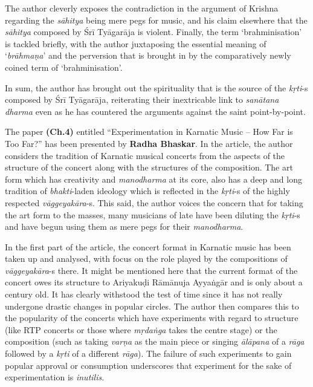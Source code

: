 The author cleverly exposes the contradiction in the argument of Krishna regarding the \textit{sāhitya} being mere pegs for music, and his claim elsewhere that the \textit{sāhitya} composed by Śrī Tyāgarāja is violent. Finally, the term ‘brahminisation’ is tackled briefly, with the author juxtaposing the essential meaning of ‘\textit{brāhmaṇa}’ and the perversion that is brought in by the comparatively newly coined term of ‘brahminisation’.

In sum, the author has brought out the spirituality that is the source of the \textit{kṛti}-s composed by Śrī Tyāgarāja, reiterating their inextricable link to \textit{sanātana dharma} even as he has countered the arguments against the saint point-by-point.

The paper \textbf{(Ch.4)} entitled “Experimentation in Karnatic Music – How Far is Too Far?” has been presented by \textbf{Radha Bhaskar}. In the article, the author considers the tradition of Karnatic musical concerts from the aspects of the structure of the concert along with the structures of the composition. The art form which has creativity and \textit{manodharma} at its core, also has a deep and long tradition of \textit{bhakti}-laden ideology which is reflected in the \textit{kṛti}-s of the highly respected \textit{vāggeyakāra}-s. This said, the author voices the concern that for taking the art form to the masses, many musicians of late have been diluting the \textit{kṛti}-s and have begun using them as mere pegs for their \textit{manodharma}.

In the first part of the article, the concert format in Karnatic music has been taken up and analysed, with focus on the role played by the compositions of \textit{vāggeyakāra}-s there. It might be mentioned here that the current format of the concert owes its structure to Ariyakuḍi Rāmānuja Ayyaṅgār and is only about a century old. It has clearly withstood the test of time since it has not really undergone drastic changes in popular circles. The author then compares this to the popularity of the concerts which have experiments with regard to structure (like RTP concerts or those where \textit{mṛdaṅga} takes the centre stage) or the composition (such as taking \textit{varṇa} as the main piece or singing \textit{ālāpana} of a \textit{rāga} followed by a \textit{kṛti} of a different \textit{rāga}). The failure of such experiments to gain popular approval or consumption underscores that experiment for the sake of experimentation is \textit{inutilis}.

